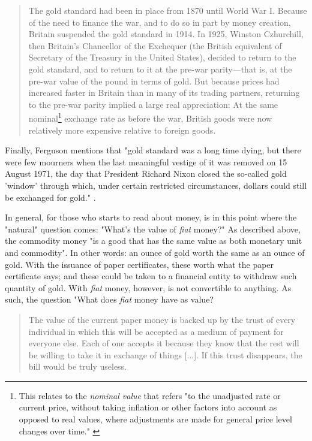 \documentclass[12pt,a4paper,twoside]{book}
\begin{document}
\begin{quotation}
The gold standard had been in place from 1870 until World War I. Because of the need to finance the war, and to do so in part by money creation, Britain suspended the gold standard in 1914. In 1925, Winston Czhurchill, then Britain’s Chancellor of the Exchequer (the British equivalent of Secretary of the Treasury in the United States), decided to return to the gold standard, and to return to it at the pre-war parity—that is, at the pre-war value of the pound in terms of gold. But because prices had increased faster in Britain than in many of its trading partners, returning to the pre-war parity implied a large real appreciation: At the same nominal\footnote{This relates to the \textit{nominal value} that refers "to the unadjusted rate or current price, without taking inflation or other factors into account as opposed to real values, where adjustments are made for general price level changes over time." \cite{ipedia:nominal}} exchange rate as before the war, British goods were now relatively more expensive relative to foreign goods. \cite[p. 415]{blanchard:macroeconomics}
\end{quotation}

Finally, Ferguson mentions that "gold standard was a long time dying, but there were few mourners when the last meaningful vestige of it was removed on 15 August 1971, the day that President Richard Nixon closed the so-called gold 'window' through which, under certain restricted circumstances, dollars could still be exchanged for gold." \cite[pág. 58]{ferguson:ascent-money}.

In general, for those who starts to read about money, is in this point where the "natural" question comes: "What's the value of \textit{fiat} money?" As described above, the commodity money "is a good that has the same value as both monetary unit and commodity". In other words: an ounce of gold worth the same as an ounce of gold. With the issuance of paper certificates, these worth what the paper certificate says; and these could be taken to a financial entity to withdraw such quantity of gold. With \textit{fiat} money, however, is not convertible to anything. As such, the question "What does \textit{fiat} money have as value?

\begin{quotation}
The value of the current paper money is backed up by the trust of every individual in which this will be accepted as a medium of payment for everyone else. Each of one accepts it because they know that the rest will be willing to take it in exchange of things [...]. If this trust disappears, the bill would be truly useless. \cite[pág. 266]{mochobeker}
\end{quotation}
\end{document}
